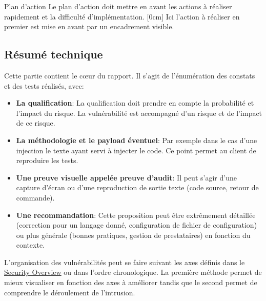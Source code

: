 \documentclass[twoside,a4paper,12pt,titlepage]{book}
\newcommand{\MarginPar}[2]{\marginnote{\scriptsize #1}[#2]}
\begin{document}
\begin{FlagConsole}{Plan d'action}
\noindent
{}%
\tcblower
Le plan d'action doit mettre en avant les actions à réaliser rapidement et la difficulté d'implémentation. \MarginPar{\textbf{Plan d'Action}}{0cm} Ici l'action à réaliser en premier est mise en avant par un encadrement visible.
\end{FlagConsole}

\subsection{Résumé technique}
Cette partie contient le cœur du rapport. Il s'agit de l'énumération des constats et des tests réalisés, avec:\begin{itemize}
\item \textbf{La qualification}: La qualification doit prendre en compte la probabilité et l'impact du risque. La vulnérabilité est accompagné d'un risque et de l'impact de ce risque.
\item \textbf{La méthodologie et le payload éventuel}: Par exemple dans le cas d'une injection le texte ayant servi à injecter le code. Ce point permet au client de reproduire les tests.
\item \textbf{Une preuve visuelle appelée preuve d'audit}: Il peut s'agir d'une capture d'écran ou d'une reproduction de sortie texte (code source, retour de commande).
\item \textbf{Une recommandation}: Cette proposition peut être extrêmement détaillée (correction pour un langage donné, configuration de fichier de configuration) ou plus générale (bonnes pratiques, gestion de prestataires) en fonction du contexte.
\end{itemize}
L'organisation des vulnérabilités peut se faire suivant les axes définis dans le \hyperref[SecurityOverview]{Security Overview} ou dans l'ordre chronologique. La première méthode permet de mieux visualiser en fonction des axes à améliorer tandis que le second permet de comprendre le déroulement de l'intrusion.
\newpage

\begin{lrbox}{\SchematicsBox}
\end{lrbox}
\end{document}
